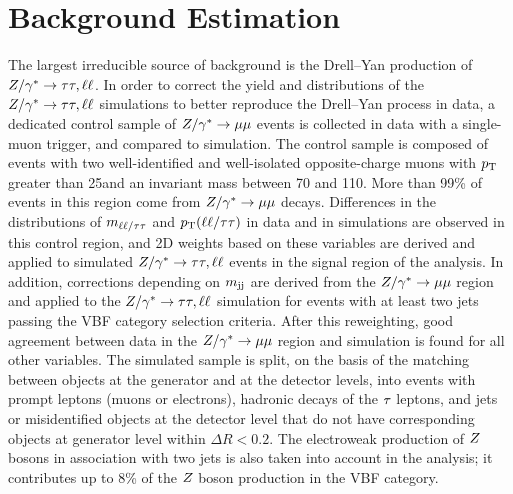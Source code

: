 \section{Background Estimation}
The largest irreducible source of background is the Drell--Yan production
of $Z/\gamma^*\to\tau\tau, \ell\ell$.
In order to correct the yield and distributions of the $Z/\gamma^*\to\tau\tau, \ell\ell$ simulations to better reproduce the Drell--Yan process in data, a dedicated control sample of $Z/\gamma^*\to\mu\mu$
events is collected in data with a single-muon trigger, and compared to simulation. The control sample is composed of events with two well-identified
and well-isolated opposite-charge muons with $p_\mathrm{T}$ greater than 25\GeV and an invariant mass between 70 and 110\GeV.
More than 99\% of events in this region come from $Z/\gamma^*\to\mu\mu$ decays.
Differences in the distributions of $m_{\ell\ell/\tau\tau}$ and $p_\mathrm{T}(\ell\ell/\tau\tau)$ in data and in simulations are observed in this control region, and 2D weights based on these variables are derived and applied to simulated $Z/\gamma^*\to\tau\tau, \ell\ell$ events in the signal region of the analysis. In addition, corrections depending on $m_\mathrm{jj}$ are derived from the $Z/\gamma^*\to\mu\mu$ region and applied to the $Z/\gamma^*\to\tau\tau, \ell\ell$ simulation for events with at least two jets passing the VBF category selection criteria. After this reweighting, good agreement between data in the $Z/\gamma^*\to\mu\mu$ region and simulation is found for all other variables.
The simulated sample is split, on the basis of the matching between objects at the generator and at the detector levels,
into events with prompt leptons (muons or electrons), hadronic decays of the $\tau$ leptons,
and jets or misidentified objects at the detector level that do not have corresponding objects
at generator level within $\Delta R < 0.2$.
The electroweak production of $Z$ bosons in association with two jets is also taken into account in the analysis; it
contributes up to 8\% of the $Z$ boson production in the VBF category.

